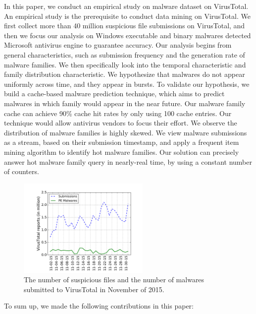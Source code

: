 In this paper, we conduct an empirical study on malware dataset on VirusTotal. 
An empirical study is the prerequisite to conduct data mining on VirusTotal. 
We first collect more than 40 million suspicious file submissions on VirusTotal, and then 
we focus our analysis on Windows executable and binary malwares detected Microsoft
antivirus engine to guarantee accuracy. 
Our analysis begins from general characteristics, such as submission frequency and the generation rate of malware families. 
We then specifically look into the temporal characteristic and family distribution characteristic. 
We hypothesize that malwares do not appear uniformly across time, and they appear in bursts. 
To validate our hypothesis, we build a cache-based malware prediction technique, which aims to predict malwares in which family would appear in the near future. 
Our malware family cache can achieve 90\% cache hit rates by only using 100 cache entries.
Our technique would allow antivirus vendors to focus their effort. 
We observe the distribution of malware families is highly skewed. 
We view malware submissions as a stream, based on their submission timestamp, and apply a frequent item mining algorithm to identify hot malware families. 
Our solution can precisely answer hot malware family query in nearly-real time, by using a constant number of counters. 


\begin{figure}[t!]
\begin{center}
\includegraphics[width=2.5in]{figure/nov}
\caption{The number of suspicious files and the number of malwares submitted to VirusTotal in November of 2015. }
\label{fig:subnum}
\end{center}
\end{figure}

To sum up, we made the following contributions in this paper:

